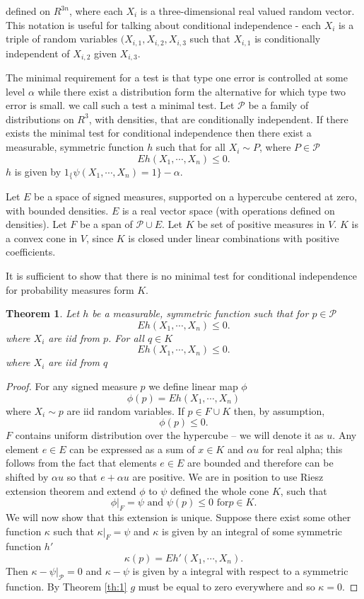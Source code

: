 \documentclass{article}
\newtheorem{Theorem}{Theorem}
\begin{document}
defined on  $R^{3n}$, where each $X_i$ is a three-dimensional real valued random vector. This notation is useful for talking about conditional independence - each $X_i$ is a triple of random variables $(X_{i,1},X_{i,2},X_{i,3}$ such that $X_{i,1}$ is conditionally independent of $X_{i,2}$ given $X_{i,3}$.


The minimal requirement for a test is that type one error is controlled at some level $\alpha$ while there exist a distribution form the alternative for which type two error is small. we call such a test a minimal test.  Let $\mathcal P$ be a family of distributions on $R^3$, with densities, that are conditionally independent. If there exists the minimal test for conditional independence then there exist a measurable, symmetric function $h$ such that for all $X_i \sim P$, where $P \in \mathcal P$
\[
 E h(X_1, \cdots , X_n) \leq 0.
\]
$h$ is given by $1_\{ \psi(X_1, \cdots, X_n) =1 \} - \alpha$.  

Let $E$ be a space of signed measures, supported on a hypercube centered at zero, with bounded densities. $E$ is a real vector space (with operations defined on densities). Let $F$ be a span of $\mathcal P \cup E$. Let $K$ be set of positive measures in $V$. $K$ is a convex cone in $V$, since $K$ is closed under linear combinations with positive coefficients.

It is sufficient to show that there is no minimal test for conditional independence for probability measures form $K$. 



\begin{Theorem}
 Let $h$ be a measurable, symmetric function such that for $p \in \mathcal P$ 
 \[
 E h(X_1, \cdots , X_n) \leq 0.
\]
where $X_i$ are iid from $p$. For all $q \in K$
\[
 E h(X_1, \cdots , X_n) \leq 0.
\]
where $X_i$ are iid from $q$
\end{Theorem}

\begin{proof}
 
 For any signed measure  $p$ we define linear map $\phi$
 \[
  \phi(p) =  E h(X_1, \cdots , X_n)
 \]
where $X_i \sim p$ are iid random variables. If $p \in F \cup K$ then, by assumption, 
\[
  \phi(p) \leq 0.
\]
$F$ contains uniform distribution over the hypercube -- we will denote it as $u$. Any element  $e \in E$ can be expressed as a sum of $x \in K$ and $\alpha u$ for real alpha; this follows from the fact that elements  $ e \in E$ are bounded and therefore can be shifted by $\alpha u$ so that $e + \alpha u$ are positive. We are in position to use Riesz extension theorem and extend $\phi$ to $\psi$ defined the whole cone $K$, such that 
\[
 \phi |_{F} = \psi \text{ and } \psi(p) \leq 0 \text{ for} p \in K.
\]
We will now show that this extension is unique. Suppose there exist some other function $\kappa$ such that $\kappa |_{F} = \psi$ and $\kappa$ is given by an integral of some symmetric function $h'$
 \[
  \kappa(p) =  E h'(X_1, \cdots , X_n).
 \]
Then $\kappa - \psi |_{\mathcal{P}} = 0$ and $\kappa - \psi$ is given by a integral with respect to a symmetric function. By Theorem \ref{th:1} $g$ must be equal to zero everywhere and so $\kappa =0$.   
\end{proof}
\end{document}
